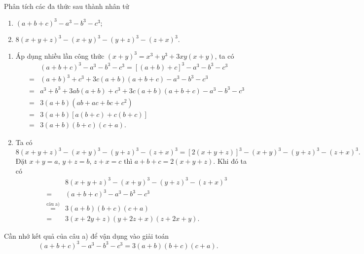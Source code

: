 \begin{vn}
	Phân tích các đa thức sau thành nhân tử
	\begin{enumerate}
		\item $(a+b+c)^3 - a^3 - b^3 - c^3$;
		\item $8(x+y+z)^3 - (x+y)^3 - (y+z)^3 - (z+x)^3$.
	\end{enumerate}
	\loigiai 
	{
		\begin{enumerate}
			\item Áp dụng nhiều lần công thức $(x+y)^3 = x^3 + y^3 + 3xy(x+y)$, ta có
			{\allowdisplaybreaks
			\begin{eqnarray*}
				&& (a+b+c)^3 - a^3 - b^3 - c^3 = \left[(a+b) + c\right]^3  - a^3 - b^3 - c^3 \\
				&=& (a+b)^3 + c^3 + 3c(a+b)(a+b+c) - a^3 - b^3 - c^3 \\
				&=& a^3 + b^3 + 3ab(a+b) + c^3 + 3c(a+b)(a+b+c) - a^3 - b^3 - c^3\\
				&=& 3(a+b)(ab+ac+bc+c^2) \\
				&=& 3(a+b) \left[a(b+c) + c(b+c)\right] \\
				&=& 3(a+b)(b+c)(c+a).
			\end{eqnarray*}
			}
			\item Ta có \[8(x+y+z)^3 - (x+y)^3 - (y+z)^3 - (z+x)^3 = \left[2(x+y+z)\right]^3 - (x+y)^3 - (y+z)^3 - (z+x)^3.\]
			Đặt $x+y=a$, $y+z=b$, $z+x=c$ thì $a+b+c = 2(x+y+z)$. Khi đó ta có
			{\allowdisplaybreaks
			\begin{eqnarray*}
				&& 8(x+y+z)^3 - (x+y)^3 - (y+z)^3 - (z+x)^3 \\
				&=& (a+b+c)^3 - a^3 - b^3 - c^3 \\
				&\stackrel{\text{câu a)}}{=}& 3(a+b)(b+c)(c+a) \\
				&=& 3(x+2y+z)(y+2z+x)(z+2x+y).
			\end{eqnarray*}
			}
		\end{enumerate}
		\begin{note}
			Cần nhớ kết quả của câu a) để vận dụng vào giải toán
			\[(a+b+c)^3 - a^3 - b^3 - c^3 = 3(a+b)(b+c)(c+a).\]
		\end{note}
	}
\end{vn}

